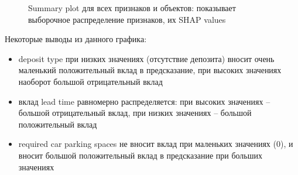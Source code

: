 \begin{figure}[h]
	\caption*{Summary plot для всех признаков и объектов: показывает выборочное распределение признаков, их SHAP values}
\end{figure}

Некоторые выводы из данного графика:
\begin{itemize}
	\item deposit type при низких значениях (отсутствие депозита) вносит очень маленький положительный вклад в предсказание, при высоких значениях наоборот большой отрицательный вклад
	\item вклад lead time равномерно распределяется: при высоких значениях -- большой отрицательный вклад, при низких значениях -- большой положительный вклад
	\item required car parking spaces не вносит вклад при маленьких значениях (0), и вносит большой положительный вклад в предсказание при больших значениях
\end{itemize}